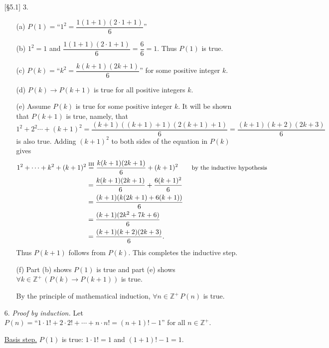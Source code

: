 \documentclass{article}
\begin{document}
\begin{enumerate}
    \item[{[\S 5.1]} 3.]
        \begin{itemize}
            \item[(a)] $P(1) = \text{``}1^2 = \dfrac{1(1+1)(2\cdot 1 + 1)}{6}\text{''}$
            \item[(b)] $1^2 = 1$ and $\dfrac{1(1+1)(2\cdot 1 + 1)}{6} = \dfrac{6}{6} = 1$. Thus $P(1)$ is true.
            \item[(c)] $P(k) = \text{``}k^2 = \dfrac{k(k+1)(2k+1)}{6}\text{''}$ for some positive integer $k$.
            \item[(d)] $P(k) \rightarrow P(k+1)$ is true for all positive integers $k$.
            \item[(e)] Assume $P(k)$ is true for some positive integer $k$. It will be shown that $P(k+1)$ is true, namely, that
            \[
            1^2 + 2^2 \cdots + (k+1)^2 = \frac{(k+1)((k+1)+1)(2(k+1)+1)}{6} = \frac{(k+1)(k+2)(2k+3)}{6}
            \]
            is also true. Adding $(k+1)^2$ to both sides of the equation in $P(k)$ gives
            \begin{align*}
            1^2 + \cdots + k^2 + (k+1)^2 &\overset{\mathrm{IH}}{=} \frac{k(k+1)(2k+1)}{6} + (k+1)^2 \tag*{\small{by the inductive hypothesis}}\\
            &= \frac{k(k+1)(2k+1)}{6} + \frac{6(k+1)^2}{6}\\
            &= \frac{(k+1)(k(2k+1)+6(k+1))}{6}\\
            &= \frac{(k+1)(2k^2+7k+6)}{6}\\
            &= \frac{(k+1)(k+2)(2k+3)}{6}.
            \end{align*}
            Thus $P(k+1)$ follows from $P(k)$. This completes the inductive step.
            \item[(f)] Part (b) shows $P(1)$ is true and part (e) shows $\forall k \in \mathbb{Z}^+ \, \left( P(k) \rightarrow P(k+1) \right)$ is true.

            By the principle of mathematical induction, $\forall n \in \mathbb{Z}^+ \, P(n)$ is true.
        \end{itemize}
    \item[6.] \textit{Proof by induction.} Let $P(n) = \text{``}1 \cdot 1! + 2 \cdot 2! + \cdots + n \cdot n! = (n+1)!-1\text{''}$ for all $n \in \mathbb{Z}^+$.

    \underline{Basis step.} $P(1)$ is true: $1 \cdot 1! = 1$ and $(1+1)!-1 = 1$.


\end{enumerate}
\end{document}
